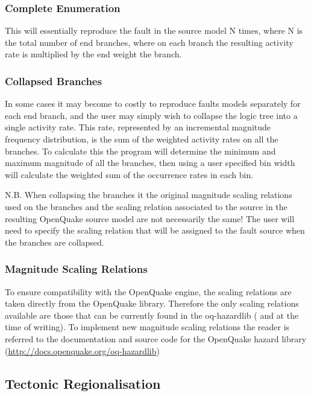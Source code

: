 \subsubsection{Complete Enumeration}

This will essentially reproduce the fault in the source model N times, where N is the total number of end branches, where on each branch the resulting activity rate is multiplied by the end weight the branch.

\subsubsection{Collapsed Branches}

In some cases it may become to costly to reproduce faults models separately for each end branch, and the user may simply wish to collapse the logic tree into a single activity rate. This rate, represented by an incremental magnitude frequency distribution, is the sum of the weighted activity rates on all the branches. To calculate this the program will determine the minimum and maximum magnitude of all the branches, then using a user specified bin width will calculate the weighted sum of the occurrence rates in each bin. 

N.B. When collapsing the branches it the original magnitude scaling relations used on the branches and the scaling relation associated to the source in the resulting OpenQuake source model are not necessarily the same! The user will need to specify the scaling relation that will be assigned to the fault source when the branches are collapsed. 

\subsubsection{Magnitude Scaling Relations}

To ensure compatibility with the OpenQuake engine, the scaling relations are taken directly from the OpenQuake library. Therefore the only scaling relations available are those that can be currently found in the oq-hazardlib (\textcite{wells1994} and \textcite{thomas2010} at the time of writing). To implement new magnitude scaling relations the reader is referred to the documentation and source code for the OpenQuake hazard library (\href{http://docs.openquake.org/oq-hazardlib}{http://docs.openquake.org/oq-hazardlib})

\subsection{Tectonic Regionalisation}

